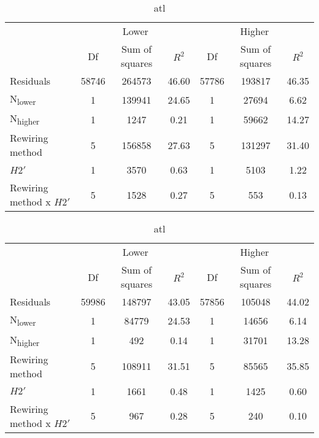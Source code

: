 \documentclass[12pt,a4paper]{article}
\begin{document}
\begin{table}
\ContinuedFloat
\caption{continued}
    \begin{subtable}{\linewidth}
    \caption{atL}
    \centering
\begin{tabularx}{\linewidth}{@{} X *6{c} @{}}
\toprule
  & \multicolumn{3}{c}{Lower} & \multicolumn{3}{c}{Higher} \\ \cmidrule(l){2-4} \cmidrule(l){5-7}
  						& Df		& Sum of squares	& $R^2$	& Df 	& Sum of squares	& $R^2$ \\ \midrule
Residuals 				& 58746 & 264573		& 46.60	& 57786 & 193817 		& 46.35   \\
N\textsubscript{lower} 	& 1 		& 139941 		& 24.65 	& 1		& 27694 		& 6.62  \\
N\textsubscript{higher} 	& 1 		& 1247 			& 0.21	& 1 		& 59662			& 14.27  \\
Rewiring method 			& 5 		& 156858			& 27.63 	& 5 		& 131297			& 31.40  \\
$H2'$ 					& 1 		& 3570 			& 0.63 	& 1 		& 5103			& 1.22 \\
Rewiring method x $H2'$ 	& 5 		& 1528 			& 0.27 	& 5 		& 553			& 0.13  \\ \bottomrule
\end{tabularx}
\end{subtable}

\medskip
    \begin{subtable}{\linewidth}
    \caption{atl}
    \centering
\begin{tabularx}{\linewidth}{@{} X *6{c} @{}}
\toprule
  & \multicolumn{3}{c}{Lower} & \multicolumn{3}{c}{Higher} \\ \cmidrule(l){2-4} \cmidrule(l){5-7}
  						& Df		& Sum of squares	& $R^2$	& Df 	& Sum of squares	& $R^2$ \\ \midrule
Residuals 				& 59986 & 148797			& 43.05	& 57856 & 105048		& 44.02   \\
N\textsubscript{lower} 	& 1 		& 84779 			& 24.53 	& 1		& 14656			& 6.14  \\
N\textsubscript{higher} 	& 1 		& 492 			& 0.14	& 1 		& 31701 		& 13.28  \\
Rewiring method 			& 5 		& 108911 		& 31.51 	& 5 		& 85565			& 35.85  \\
$H2'$ 					& 1 		& 1661 			& 0.48 	& 1 		& 1425			& 0.60 \\
Rewiring method x $H2'$ 	& 5 		& 967 			& 0.28 	& 5 		& 240			&  0.10  \\ \bottomrule
\end{tabularx}
\end{subtable}


\end{table}
\end{document}
